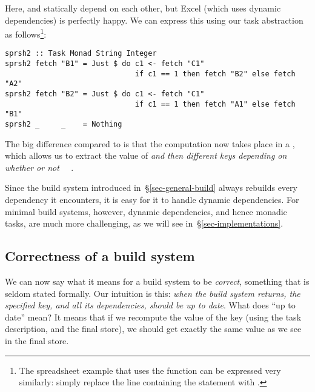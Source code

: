 \noindent
Here,  and  statically depend on each other, but Excel (which
uses dynamic dependencies) is perfectly happy. We can express this using
our task abstraction as follows\footnote{The spreadsheet example that uses
the  function can be expressed very similarly: simply replace the
line containing the  statement with .}:

\vspace{1mm}
\begin{verbatim}
sprsh2 :: Task Monad String Integer
sprsh2 fetch "B1" = Just $ do c1 <- fetch "C1"
                              if c1 == 1 then fetch "B2" else fetch "A2"
sprsh2 fetch "B2" = Just $ do c1 <- fetch "C1"
                              if c1 == 1 then fetch "A1" else fetch "B1"
sprsh2 _     _    = Nothing
\end{verbatim}
\vspace{1mm}

\noindent
The big difference compared to  is that the computation now takes
place in a , which allows us to extract the value of  \emph{and
then  different keys depending on whether or not ~\hs{==}~}.

Since the  build system introduced in~\S\ref{sec-general-build} always
rebuilds every dependency it encounters, it is easy for it to handle dynamic
dependencies. For minimal build systems, however, dynamic dependencies, and hence
monadic tasks, are much more challenging, as we will see
in~\S\ref{sec-implementations}.

\subsection{Correctness of a build system} \label{sec-build-correctness}

We can now say what it means for a build system to be \emph{correct}, something
that is seldom stated formally. Our intuition is this: \emph{when the build system
  returns, the specified key, and all its dependencies, should be up to date}.
What does ``up to date'' mean?  It means that if we recompute the value of the
key (using the task description, and the final store), we should get exactly
the same value as we see in the final store.

